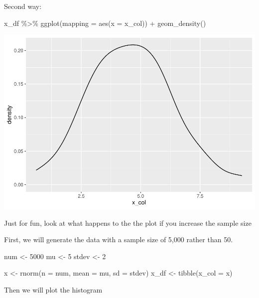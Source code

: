 \documentclass[
]{book}
\newenvironment{Shaded}{\begin{snugshade}}{\end{snugshade}}
\newcommand{\AttributeTok}[1]{\textcolor[rgb]{0.77,0.63,0.00}{#1}}
\newcommand{\DecValTok}[1]{\textcolor[rgb]{0.00,0.00,0.81}{#1}}
\newcommand{\FunctionTok}[1]{\textcolor[rgb]{0.00,0.00,0.00}{#1}}
\newcommand{\NormalTok}[1]{#1}
\newcommand{\OtherTok}[1]{\textcolor[rgb]{0.56,0.35,0.01}{#1}}
\newcommand{\SpecialCharTok}[1]{\textcolor[rgb]{0.00,0.00,0.00}{#1}}
\begin{document}
Second way:

\begin{Shaded}
\begin{Highlighting}[]
\NormalTok{x\_df }\SpecialCharTok{\%\textgreater{}\%}
  \FunctionTok{ggplot}\NormalTok{(}\AttributeTok{mapping =} \FunctionTok{aes}\NormalTok{(}\AttributeTok{x =}\NormalTok{ x\_col)) }\SpecialCharTok{+}
  \FunctionTok{geom\_density}\NormalTok{()}
\end{Highlighting}
\end{Shaded}

\includegraphics{test_course_notes_files/figure-latex/unnamed-chunk-27-1.pdf}

Just for fun, look at what happens to the the plot if you increase the sample size

First, we will generate the data with a sample size of 5,000 rather than 50.

\begin{Shaded}
\begin{Highlighting}[]
\NormalTok{num }\OtherTok{\textless{}{-}} \DecValTok{5000}
\NormalTok{mu }\OtherTok{\textless{}{-}} \DecValTok{5}
\NormalTok{stdev }\OtherTok{\textless{}{-}} \DecValTok{2}

\NormalTok{x }\OtherTok{\textless{}{-}} \FunctionTok{rnorm}\NormalTok{(}\AttributeTok{n =}\NormalTok{ num, }\AttributeTok{mean =}\NormalTok{ mu, }\AttributeTok{sd =}\NormalTok{ stdev)}
\NormalTok{x\_df }\OtherTok{\textless{}{-}} \FunctionTok{tibble}\NormalTok{(}\AttributeTok{x\_col =}\NormalTok{ x)}
\end{Highlighting}
\end{Shaded}

Then we will plot the histogram
\end{document}
